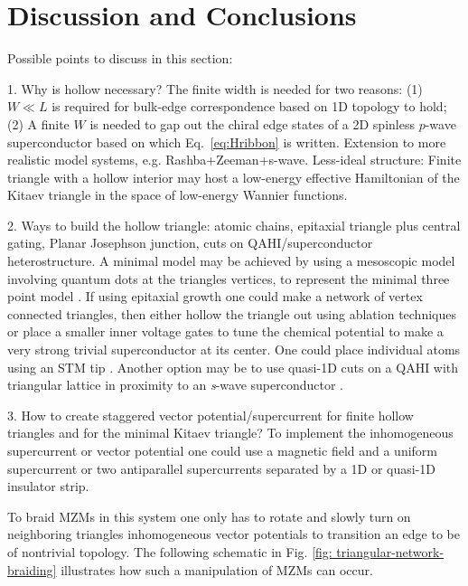 \documentclass[aps,prb,showpacs,amsmath,twocolumn,amssymb,superscriptaddress]{revtex4-2}
\begin{document}
\section{Discussion and Conclusions}

Possible points to discuss in this section:

1. Why is hollow necessary? The finite width is needed for two reasons: (1) $W\ll L$ is required for bulk-edge correspondence based on 1D topology to hold; (2) A finite $W$ is needed to gap out the chiral edge states of a 2D spinless $p$-wave superconductor based on which Eq.~\eqref{eq:Hribbon} is written. Extension to more realistic model systems, e.g. Rashba+Zeeman+s-wave. Less-ideal structure: Finite triangle with a hollow interior may host a low-energy effective Hamiltonian of the Kitaev triangle in the space of low-energy Wannier functions.

2. Ways to build the hollow triangle: atomic chains, epitaxial triangle plus central gating, Planar Josephson junction, cuts on QAHI/superconductor heterostructure. A minimal model may be achieved by using a mesoscopic model involving quantum dots at the triangles vertices, to represent the minimal three point model \cite{dvirRealizationMinimalKitaev2023}. If using epitaxial growth \cite{pietzschSpinResolvedElectronicStructure2006} one could make a network of vertex connected triangles, then either hollow the triangle out using ablation techniques or place a smaller inner voltage gates to tune the chemical potential to make a very strong trivial superconductor at its center. One could place individual atoms using an STM tip \cite{schneiderPrecursorsMajoranaModes2022}. Another option may be to use quasi-1D cuts on a QAHI with triangular lattice in proximity to an \textit{s}-wave superconductor \cite{xieCreatingLocalizedMajorana2021}.

3. How to create staggered vector potential/supercurrent for finite hollow triangles and for the minimal Kitaev triangle? To implement the inhomogeneous supercurrent or vector potential one could use a magnetic field and a uniform supercurrent or two antiparallel supercurrents separated by a 1D or quasi-1D insulator strip.

To braid MZMs in this system one only has to rotate and slowly turn on neighboring triangles inhomogeneous vector potentials to transition an edge to be of nontrivial topology.
The following schematic in Fig. \ref{fig: triangular-network-braiding} illustrates how such a manipulation of MZMs can occur.
\end{document}
